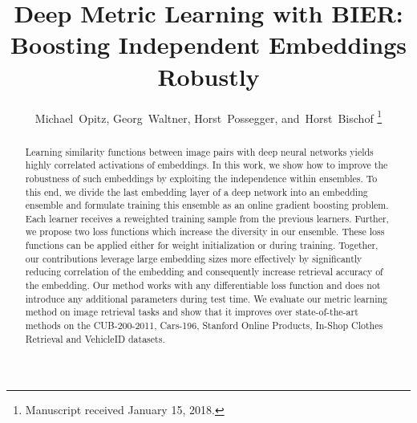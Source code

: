 \documentclass[10pt,journal,compsoc]{IEEEtran}
\begin{document}
\title{Deep Metric Learning with BIER: \\ Boosting Independent Embeddings Robustly}\author{Michael~Opitz,
        Georg~Waltner,
        Horst~Possegger,
        and~Horst~Bischof%
\thanks{Manuscript received January 15, 2018.}}%
\begin{abstract}
Learning similarity functions between image pairs with deep neural networks yields highly correlated activations of embeddings.
In this work, we show how to improve the robustness of such embeddings by exploiting the independence within ensembles.
To this end, we divide the last embedding layer of a deep network into an embedding ensemble and
formulate training this
ensemble as an online gradient boosting problem. Each learner receives a
reweighted training sample from the previous learners. Further, we propose two loss functions 
which increase the diversity in our ensemble. These loss functions can be applied either for weight 
initialization or during training. Together, our contributions leverage large
embedding sizes more effectively by significantly reducing correlation of
the embedding and consequently increase retrieval accuracy of the embedding. Our method works with any differentiable 
loss function and does not introduce any additional parameters during test time. 
We evaluate our metric learning method
on image retrieval tasks and show that it improves over
state-of-the-art methods on the CUB-200-2011, Cars-196, Stanford Online
Products, In-Shop Clothes Retrieval and VehicleID datasets.
\end{abstract}
\end{document}
